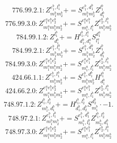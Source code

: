 \documentclass[letterpaper,10pt,fleqn,leqno,onecolumn]{article}
\begin{document}
\begin{equation} \;\;\;\;\;\;  776.99.2.1: Z^{e_{1}^{b},l_{1}^{b}}_{m_{1}^{b}m_{2}^{b}}+=S^{e_{1}^{b},d_{1}^{b}}_{m_{1}^{b}m_{2}^{b}}Z^{l_{1}^{b}}_{d_{1}^{b}} \end{equation}
\begin{equation} \;\;\;\;\;\;  776.99.3.0: Z^{e_{1}^{a}e_{1}^{b}e_{2}^{b}}_{m_{1}^{a}m_{1}^{b}m_{2}^{b}}+=S^{e_{1}^{a}e_{1}^{b}}_{m_{1}^{a},l_{1}^{b}}Z^{e_{2}^{b},l_{1}^{b}}_{m_{1}^{b}m_{2}^{b}} \end{equation}
\begin{equation} \;\;\;\;\;\;  784.99.1.2: Z^{l_{1}^{b}}_{d_{1}^{b}}+=H^{l_{1}^{b},l_{1}^{a}}_{d_{1}^{b},d_{1}^{a}}S^{d_{1}^{a}}_{l_{1}^{a}} \end{equation}
\begin{equation} \;\;\;\;\;\;  784.99.2.1: Z^{e_{1}^{b},l_{1}^{b}}_{m_{1}^{b}m_{2}^{b}}+=S^{e_{1}^{b},d_{1}^{b}}_{m_{1}^{b}m_{2}^{b}}Z^{l_{1}^{b}}_{d_{1}^{b}} \end{equation}
\begin{equation} \;\;\;\;\;\;  784.99.3.0: Z^{e_{1}^{a}e_{1}^{b}e_{2}^{b}}_{m_{1}^{a}m_{1}^{b}m_{2}^{b}}+=S^{e_{1}^{a}e_{1}^{b}}_{m_{1}^{a},l_{1}^{b}}Z^{e_{2}^{b},l_{1}^{b}}_{m_{1}^{b}m_{2}^{b}} \end{equation}
\begin{equation} \;\;\;\;\;\;  424.66.1.1: Z^{e_{1}^{b},l_{1}^{b}}_{m_{1}^{b}m_{2}^{b}}+=S^{e_{1}^{b},d_{1}^{b}}_{m_{1}^{b}m_{2}^{b}}H^{l_{1}^{b}}_{d_{1}^{b}} \end{equation}
\begin{equation} \;\;\;\;\;\;  424.66.2.0: Z^{e_{1}^{a}e_{1}^{b}e_{2}^{b}}_{m_{1}^{a}m_{1}^{b}m_{2}^{b}}+=S^{e_{1}^{a}e_{1}^{b}}_{m_{1}^{a},l_{1}^{b}}Z^{e_{2}^{b},l_{1}^{b}}_{m_{1}^{b}m_{2}^{b}} \end{equation}
\begin{equation} \;\;\;\;\;\;  748.97.1.2: Z^{l_{1}^{b},l_{2}^{b}}_{m_{1}^{b},d_{1}^{b}}+=H^{l_{1}^{b},l_{2}^{b}}_{d_{1}^{b},d_{2}^{b}}S^{d_{2}^{b}}_{m_{1}^{b}}\cdot -1. \end{equation}
\begin{equation} \;\;\;\;\;\;  748.97.2.1: Z^{e_{1}^{b},l_{1}^{b}}_{m_{1}^{b}m_{2}^{b}}+=S^{e_{1}^{b},d_{1}^{b}}_{m_{1}^{b},l_{2}^{b}}Z^{l_{1}^{b},l_{2}^{b}}_{m_{2}^{b},d_{1}^{b}} \end{equation}
\begin{equation} \;\;\;\;\;\;  748.97.3.0: Z^{e_{1}^{a}e_{1}^{b}e_{2}^{b}}_{m_{1}^{a}m_{1}^{b}m_{2}^{b}}+=S^{e_{1}^{a}e_{1}^{b}}_{m_{1}^{a},l_{1}^{b}}Z^{e_{2}^{b},l_{1}^{b}}_{m_{1}^{b}m_{2}^{b}} \end{equation}
\end{document}
